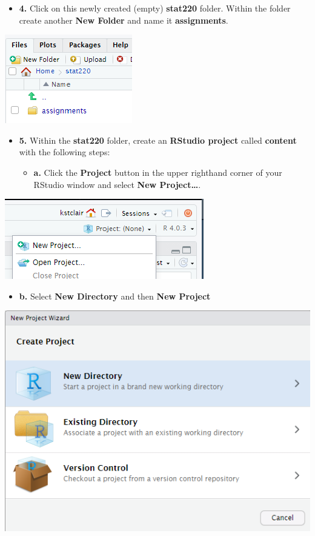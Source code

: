 \documentclass[
]{book}
\providecommand{\tightlist}{%
  \setlength{\itemsep}{0pt}\setlength{\parskip}{0pt}}
\begin{document}
\begin{itemize}
\tightlist
\item
  \textbf{4.} Click on this newly created (empty) \textbf{stat220} folder.
  Within the folder create another \textbf{New Folder} and name it
  \textbf{assignments}.
\end{itemize}

\includegraphics{img/maize_stat220.png}

\begin{itemize}
\item
  \textbf{5.} Within the \textbf{stat220} folder, create an \textbf{RStudio project}
  called \textbf{content} with the following steps:

  \begin{itemize}
  \tightlist
  \item
    \textbf{a.} Click the \textbf{Project} button in the upper righthand
    corner of your RStudio window and select \textbf{New Project\ldots{}}.
  \end{itemize}
\end{itemize}

\includegraphics{img/maize_project.png}

\begin{itemize}
\tightlist
\item
  \textbf{b.} Select \textbf{New Directory} and then \textbf{New Project}
\end{itemize}

\includegraphics{img/maize_newdirectory.png}
\end{document}
